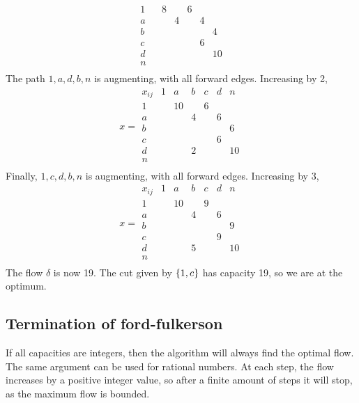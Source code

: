 \begin{example}
\[\begin{array}{c|cccccc}
			1      &   & 8 &   & 6 &   &    \\
			a      &   &   & 4 &   & 4 &    \\
			b      &   &   &   &   &   & 4  \\
			c      &   &   &   &   & 6 &    \\
			d      &   &   &   &   &   & 10 \\
			n                               \\
		\end{array}
	\]
	The path \( 1,a,d,b,n \) is augmenting, with all forward edges.
	Increasing by 2,
	\[
		x = \begin{array}{c|cccccc}
			x_{ij} & 1 & a  & b & c & d & n  \\\hline
			1      &   & 10 &   & 6 &   &    \\
			a      &   &    & 4 &   & 6 &    \\
			b      &   &    &   &   &   & 6  \\
			c      &   &    &   &   & 6 &    \\
			d      &   &    & 2 &   &   & 10 \\
			n                                \\
		\end{array}
	\]
	Finally, \( 1,c,d,b,n \) is augmenting, with all forward edges.
	Increasing by 3,
	\[
		x = \begin{array}{c|cccccc}
			x_{ij} & 1 & a  & b & c & d & n  \\\hline
			1      &   & 10 &   & 9 &   &    \\
			a      &   &    & 4 &   & 6 &    \\
			b      &   &    &   &   &   & 9  \\
			c      &   &    &   &   & 9 &    \\
			d      &   &    & 5 &   &   & 10 \\
			n                                \\
		\end{array}
	\]
	The flow \( \delta \) is now 19.
	The cut given by \( \qty{1,c} \) has capacity 19, so we are at the optimum.
\end{example}

\subsection{Termination of ford-fulkerson}
If all capacities are integers, then the algorithm will always find the optimal flow.
The same argument can be used for rational numbers.
At each step, the flow increases by a positive integer value, so after a finite amount of steps it will stop, as the maximum flow is bounded.

